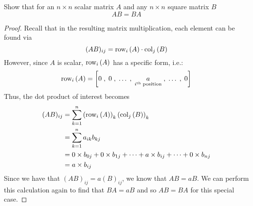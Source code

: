 \documentclass{tutorial}
\begin{document}
\begin{prob}
Show that for an $n \times n$ scalar matrix $A$ and any $n \times n$ square matrix $B$
\[
	AB = BA
\]
\end{prob} \ifsolns \begin{proof} Recall that in the resulting matrix multiplication, each element can be found via
\[
	(AB)_{ij} = \row{A}{i} \cdot \col{B}{j}
\]
However, since $A$ is scalar, $\row{A}{i}$ has a specific form, i.e.:
\[
	\row{A}{i} = \ls 0 \; , \; 0 \; , \; \dots \; , \; \underset{i^{\text{th}}\; \text{position}}{a} \;, \; \dots \; , \; 0 \rs
\]
Thus, the dot product of interest becomes
\begin{align*}
	(AB)_{ij}
	& = \sum_{k=1}^n \lp \row{A}{i} \rp_k \lp \col{B}{j} \rp_k \\
	& = \sum_{k=1}^n a_{ik}b_{kj} \\
	& = 0 \times b_{0j} + 0 \times b_{1j} + \dots + a \times b_{ij} + \dots + 0 \times b_{nj} \\
	& = a \times b_{ij}
\end{align*}
Since we have that $(AB)_{ij} = a (B)_{ij}$, we know that $AB = aB$. We can perform this calculation again to find that $BA = aB$ and so $AB=BA$ for this special case.
\end{proof}\else \vspace{2in} \fi
\end{document}
